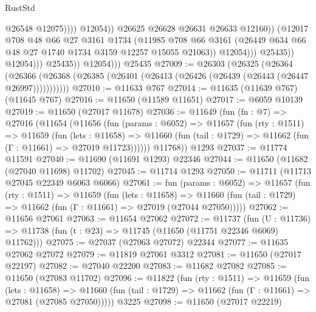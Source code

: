 \begin{lexlean}{RustStd}
\begin{coremodule}
                                            @26548
                                            @12075))))
                                    @12054))
                                @26625
                                @26628
                                @26631
                                @26633
                                @12160))
                            (@12017
                              @708
                              @48
                              @66
                              @27
                              @3161
                              @1734
                              (@11985
                                @708
                                @66
                                @3161
                                (@26449 @634 @66 @48 @27 @1740 @1734 @3159 @12257 @15055 @21063))
                              @12054)))
                        @25435))
                    @12054)))
              @25435))
          @12054)))
    @25435
@27009 := @26303
    (@26325
      (@26364
        (@26366 (@26368 (@26385 (@26401 (@26413 (@26426 (@26439 (@26443 (@26447 @26997)))))))))))
@27010 := @11633 @767
@27014 := @11635 (@11639 @767) (@11645 @767)
@27016 := @11650 (@11589 @11651)
@27017 := @6059 @10139
@27019 := @11650 (@27017 @11678)
@27036 := @11649
    (fun (fn : @7) =>
    @27016
      (@11654
        (@11656
          (fun (params : @6052) =>
          @11657
            (fun (rty : @1511) =>
            @11659
              (fun (lets : @11658) =>
              @11660 (fun (tail : @1729) => @11662 (fun (Γ : @11661) => @27019 @11723))))))
        @11768))
    @1293
@27037 := @11774 @11591
@27040 := @11690 (@11691 @1293) @22346
@27044 := @11650 (@11682 (@27040 @11698) @11702)
@27045 := @11714 @1293
@27050 := @11711 (@11713 @27045 @22349 @6063 @6066)
@27061 := fun (params : @6052) =>
  @11657
    (fun (rty : @1511) =>
    @11659
      (fun (lets : @11658) =>
      @11660 (fun (tail : @1729) => @11662 (fun (Γ : @11661) => @27019 (@27044 @27050)))))
@27062 := @11656 @27061
@27063 := @11654 @27062
@27072 := @11737
    (fun (U : @11736) => @11738 (fun (t : @23) => @11745 (@11650 (@11751 @22346 @6069) @11762)))
@27075 := @27037 (@27063 @27072) @22344
@27077 := @11635 @27062 @27072
@27079 := @11819 @27061 @3312
@27081 := @11650 (@27017 @22197)
@27082 := @27040 @22200
@27083 := @11682 @27082
@27085 := @11650 (@27083 @11702)
@27096 := @11822
    (fun (rty : @1511) =>
    @11659
      (fun (lets : @11658) =>
      @11660 (fun (tail : @1729) => @11662 (fun (Γ : @11661) => @27081 (@27085 @27050)))))
    @3225
@27098 := @11650 (@27017 @22219)

\end{coremodule}
\end{lexlean}
